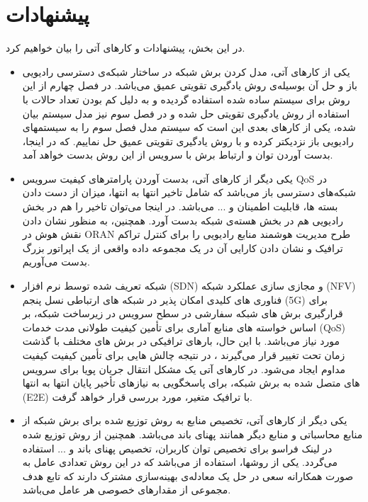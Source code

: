  \section{پیشنهادات}
 در این بخش، پیشنهادات و کارهای آتی را بیان خواهیم کرد.
 \begin{itemize}
\item
 یکی از کارهای آتی، مدل کردن برش شبکه در ساختار شبکه‌ی دسترسی رادیویی باز و حل آن بوسیله‌ی روش یادگیری تقویتی عمیق می‌باشد. در فصل چهارم از این روش برای سیستم ساده شده استفاده گردیده و به دلیل کم بودن تعداد حالات با استفاده از روش یادگیری تقویتی حل شده و در فصل سوم نیز مدل سیستم بیان شده، یکی از کارهای بعدی این است که سیستم مدل فصل سوم را به سیستمهای رادیویی باز نزدیکتر کرده و
با روش یادگیری تقویتی عمیق حل نماییم. که در اینجا، بدست آوردن توان و ارتباط برش با سرویس از این روش بدست خواهد آمد.
\item 
یکی دیگر از کارهای آتی، بدست آوردن پارامترهای کیفیت سرویس QoS
در شبکه‌های دسترسی باز می‌باشد که شامل تاخیر انتها به انتها، میزان از دست دادن بسته ها،
قابلیت اطمینان و ... می‌باشد.
در اینجا می‌توان تاخیر را هم در بخش رادیویی هم در بخش هسته‌ی شبکه بدست آورد. 
همچنین،
به منظور نشان دادن نقش هوش در ORAN طرح مدیریت هوشمند منابع رادیویی را برای کنترل تراکم ترافیک و نشان دادن کارایی آن در یک مجموعه داده واقعی از یک اپراتور بزرگ بدست می‌آوریم.
\item 
شبکه تعریف شده توسط نرم افزار (SDN) و مجازی سازی عملکرد شبکه (NFV) فناوری های کلیدی امکان پذیر در شبکه های ارتباطی نسل پنجم (5G) برای قرارگیری برش های شبکه سفارشی در سطح سرویس در زیرساخت شبکه، بر اساس خواسته های منابع آماری برای تأمین کیفیت طولانی مدت خدمات (QoS) مورد نیاز می‌باشد. با این حال، بارهای ترافیکی در برش های مختلف با گذشت زمان تحت تغییر قرار می‌گیرند ، در نتیجه چالش هایی برای تأمین کیفیت کیفیت مداوم ایجاد می‌شود.
در کارهای آتی یک مشکل انتقال جریان پویا برای سرویس های متصل شده به برش شبکه، برای پاسخگویی به نیازهای تأخیر پایان انتها به انتها (E2E) با ترافیک متغیر، مورد بررسی قرار خواهد گرفت.
\item
یکی دیگر از کارهای آتی، تخصیص منابع به روش توزیع شده برای برش شبکه از منابع محاسباتی و منابع دیگر همانند پهنای باند می‌باشد.
همچنین از روش توزیع شده در لینک فراسو  
برای تخصیص توان کاربران، تخصیص پهنای باند و ... استفاده می‌گردد. یکی از روشها، استفاده از 
می‌باشد که در این روش تعدادی عامل به صورت همکارانه سعی در حل یک معادله‌ی بهینه‌سازی مشترک دارند که تابع هدف مجموعی از مقدارهای خصوصی هر عامل ‌می‌باشد. 
 \end{itemize}
 
  